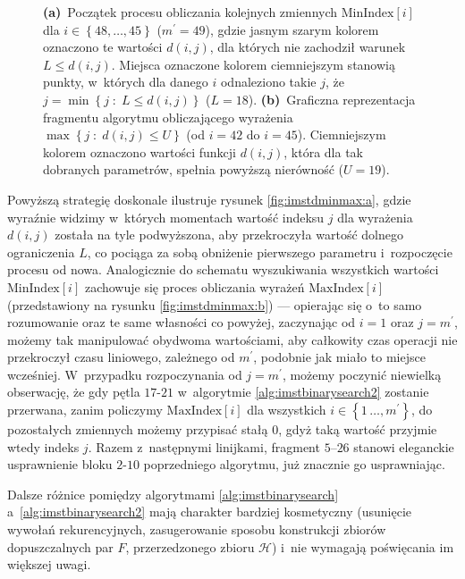\begin{figure}[!htbp]
{		\textbf{(a)}~Początek procesu obliczania kolejnych zmiennych $\text{MinIndex} \left[ i \right]$ dla $i \in \left\{ 48, \dots, 45 \right\}$ ($m^{\prime} = 49$), gdzie jasnym szarym kolorem oznaczono te wartości $d \left( i, j \right)$, dla których nie zachodził warunek $L \leqslant d \left( i, j \right)$. Miejsca oznaczone kolorem ciemniejszym stanowią punkty, w~których dla danego $i$ odnaleziono takie $j$, że $j = \min \left\{ j \; : \; L \leqslant d \left( i, j \right) \right\}$ ($L = 18$).
		\textbf{(b)}~Graficzna reprezentacja fragmentu algorytmu obliczającego wyrażenia $\max \left\{ j \; : \; d \left( i, j \right) \leqslant U \right\}$ (od $i = 42$ do $i = 45$). Ciemniejszym kolorem oznaczono wartości funkcji $d \left( i, j \right)$, która dla tak dobranych parametrów, spełnia powyższą nierówność ($U = 19$).
	}
	\label{fig:imstdminmax}
\end{figure}

 Powyższą strategię doskonale ilustruje rysunek \ref{fig:imstdminmax:a}, gdzie wyraźnie widzimy w~których momentach wartość indeksu $j$ dla wyrażenia $d \left( i, j \right)$ została na tyle podwyższona, aby przekroczyła wartość dolnego ograniczenia $L$, co pociąga za sobą obniżenie pierwszego parametru i~rozpoczęcie procesu od nowa. Analogicznie do schematu wyszukiwania wszystkich wartości $\text{MinIndex} \left[ i \right]$ zachowuje się proces obliczania wyrażeń $\text{MaxIndex} \left[ i \right]$ (przedstawiony na rysunku \ref{fig:imstdminmax:b}) --- opierając się o~to samo rozumowanie oraz te same własności co powyżej, zaczynając od $i = 1$ oraz $j = m^{\prime}$, możemy tak manipulować obydwoma wartościami, aby całkowity czas operacji nie przekroczył czasu liniowego, zależnego od $m^{\prime}$, podobnie jak miało to miejsce wcześniej. W~przypadku rozpoczynania od $j = m^{\prime}$, możemy poczynić niewielką obserwację, że gdy pętla $17$-$21$ w~algorytmie \ref{alg:imstbinarysearch2} zostanie przerwana, zanim policzymy $\text{MaxIndex} \left[ i \right]$ dla wszystkich $i \in \left\{ 1\, \dots, m^{\prime} \right\}$, do pozostałych zmiennych możemy przypisać stałą $0$, gdyż taką wartość przyjmie wtedy indeks $j$. Razem z~następnymi linijkami, fragment $5$--$26$ stanowi eleganckie usprawnienie bloku $2$-$10$ poprzedniego algorytmu, już znacznie go usprawniając.

Dalsze różnice pomiędzy algorytmami \ref{alg:imstbinarysearch} a~\ref{alg:imstbinarysearch2} mają charakter bardziej kosmetyczny (usunięcie wywołań rekurencyjnych, zasugerowanie sposobu konstrukcji zbiorów dopuszczalnych par $F$, przerzedzonego zbioru $\mathcal{H}$) i~nie wymagają poświęcania im większej uwagi.

